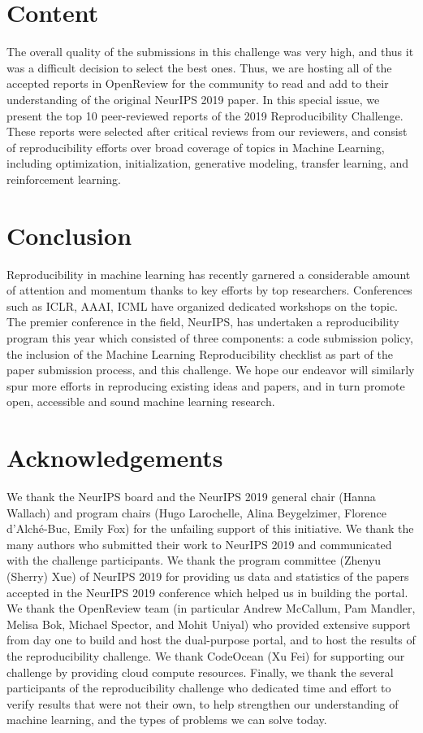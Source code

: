 \section{Content}

The overall quality of the submissions in this challenge was very high, and thus it was a difficult decision to select the best ones. Thus, we are hosting all of the accepted reports in OpenReview for the community to read and add to their understanding of the original NeurIPS 2019 paper. In this special issue, we present the top 10 peer-reviewed reports of the 2019 Reproducibility Challenge. These reports were selected after critical reviews from our reviewers, and consist of reproducibility efforts over broad coverage of topics in Machine Learning, including optimization, initialization, generative modeling, transfer learning, and reinforcement learning.

\section{Conclusion} 

Reproducibility in machine learning has recently garnered a considerable amount of attention and momentum thanks to key efforts by top researchers. Conferences such as ICLR, AAAI, ICML have organized dedicated workshops on the topic. The premier conference in the field, NeurIPS, has undertaken a reproducibility program this year which consisted of three components: a code submission policy, the inclusion of the Machine Learning Reproducibility checklist as part of the paper submission process, and this challenge. We hope our endeavor will similarly spur more efforts in reproducing existing ideas and papers, and in turn promote open, accessible and sound machine learning research.
            

\section{Acknowledgements} 

We thank the NeurIPS board and the NeurIPS 2019 general chair (Hanna Wallach) and program chairs (Hugo Larochelle, Alina Beygelzimer, Florence d’Alché-Buc, Emily Fox) for the unfailing support of this initiative. We thank the many authors who submitted their work to NeurIPS 2019 and communicated with the challenge participants. We thank the program committee (Zhenyu (Sherry) Xue) of NeurIPS 2019 for providing us data and statistics of the papers accepted in the NeurIPS 2019 conference which helped us in building the portal. We thank the OpenReview team (in particular Andrew McCallum, Pam Mandler, Melisa Bok, Michael Spector, and Mohit Uniyal) who provided extensive support from day one to build and host the dual-purpose portal, and to host the results of the reproducibility challenge. We thank CodeOcean (Xu Fei) for supporting our challenge by providing cloud compute resources. Finally, we thank the several participants of the reproducibility challenge who dedicated time and effort to verify results that were not their own, to help strengthen our understanding of machine learning, and the types of problems we can solve today.

